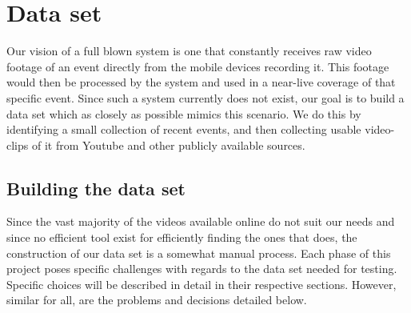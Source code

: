 \section{Data set}
\label{sec:dataset}
%
Our vision of a full blown system is one that constantly receives raw video footage of an event directly from the mobile devices recording it. This footage would then be processed by the system and used in a near-live coverage of that specific event. Since such a system currently does not exist, our goal is to build a data set which as closely as possible mimics this scenario. We do this by identifying a small collection of recent events, and then collecting usable video-clips of it from Youtube and other publicly available sources.
%
\subsection{Building the data set}
%
Since the vast majority of the videos available online do not suit our needs and since no efficient tool exist for efficiently finding the ones that does, the construction of our data set is a somewhat manual process. Each phase of this project poses specific challenges with regards to the data set needed for testing. Specific choices will be described in detail in their respective sections. However, similar for all, are the problems and decisions detailed below.
%
